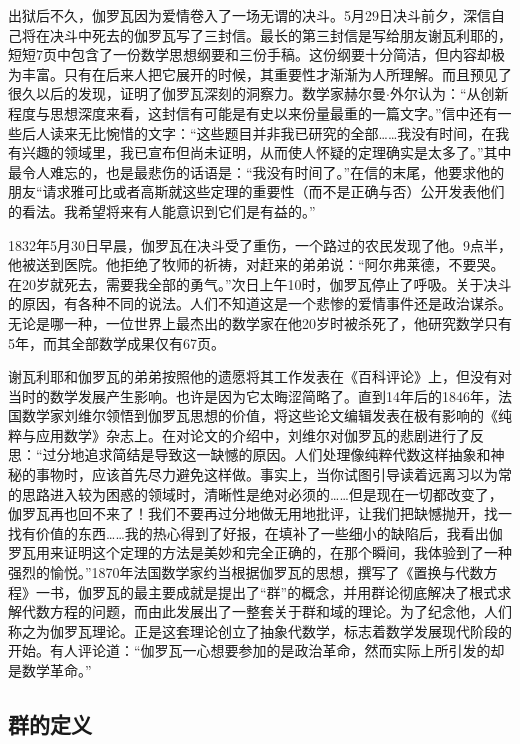 \documentclass{article}
\begin{document}
出狱后不久，伽罗瓦因为爱情卷入了一场无谓的决斗。5月29日决斗前夕，深信自己将在决斗中死去的伽罗瓦写了三封信。最长的第三封信是写给朋友谢瓦利耶的，短短7页中包含了一份数学思想纲要和三份手稿。这份纲要十分简洁，但内容却极为丰富。只有在后来人把它展开的时候，其重要性才渐渐为人所理解。而且预见了很久以后的发现，证明了伽罗瓦深刻的洞察力。数学家赫尔曼$\cdot$外尔认为：“从创新程度与思想深度来看，这封信有可能是有史以来份量最重的一篇文字。”信中还有一些后人读来无比惋惜的文字：“这些题目并非我已研究的全部……我没有时间，在我有兴趣的领域里，我已宣布但尚未证明，从而使人怀疑的定理确实是太多了。”其中最令人难忘的，也是最悲伤的话语是：“我没有时间了。”在信的末尾，他要求他的朋友“请求雅可比或者高斯就这些定理的重要性（而不是正确与否）公开发表他们的看法。我希望将来有人能意识到它们是有益的。”

1832年5月30日早晨，伽罗瓦在决斗受了重伤，一个路过的农民发现了他。9点半，他被送到医院。他拒绝了牧师的祈祷，对赶来的弟弟说：“阿尔弗莱德，不要哭。在20岁就死去，需要我全部的勇气。”次日上午10时，伽罗瓦停止了呼吸。关于决斗的原因，有各种不同的说法。人们不知道这是一个悲惨的爱情事件还是政治谋杀。无论是哪一种，一位世界上最杰出的数学家在他20岁时被杀死了，他研究数学只有5年，而其全部数学成果仅有67页。

谢瓦利耶和伽罗瓦的弟弟按照他的遗愿将其工作发表在《百科评论》上，但没有对当时的数学发展产生影响。也许是因为它太晦涩简略了。直到14年后的1846年，法国数学家刘维尔领悟到伽罗瓦思想的价值，将这些论文编辑发表在极有影响的《纯粹与应用数学》杂志上。在对论文的介绍中，刘维尔对伽罗瓦的悲剧进行了反思：“过分地追求简结是导致这一缺憾的原因。人们处理像纯粹代数这样抽象和神秘的事物时，应该首先尽力避免这样做。事实上，当你试图引导读着远离习以为常的思路进入较为困惑的领域时，清晰性是绝对必须的……但是现在一切都改变了，伽罗瓦再也回不来了！我们不要再过分地做无用地批评，让我们把缺憾抛开，找一找有价值的东西……我的热心得到了好报，在填补了一些细小的缺陷后，我看出伽罗瓦用来证明这个定理的方法是美妙和完全正确的，在那个瞬间，我体验到了一种强烈的愉悦。”1870年法国数学家约当根据伽罗瓦的思想，撰写了《置换与代数方程》一书，伽罗瓦的最主要成就是提出了“群”的概念，并用群论彻底解决了根式求解代数方程的问题，而由此发展出了一整套关于群和域的理论。为了纪念他，人们称之为伽罗瓦理论。正是这套理论创立了抽象代数学，标志着数学发展现代阶段的开始。有人评论道：“伽罗瓦一心想要参加的是政治革命，然而实际上所引发的却是数学革命。\cite{StepanovRose15}”

\subsection{群的定义}
\end{document}
